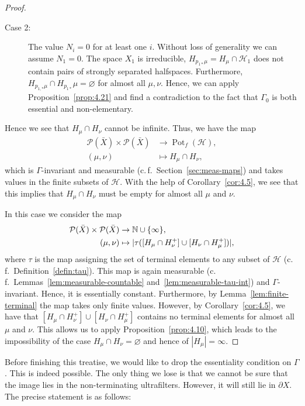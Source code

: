 \begin{proof}
\begin{description}
\begin{description}
    \item[Case 2:] The value \(N_i = 0\) for at least one \(i\). Without loss of generality we can assume \(N_1 = 0\). The space \(X_1\) is irreducible, \(H_{p_{1\ast}\mu} = H_\mu \cap \mathcal{H}_1\) does not contain pairs of strongly separated halfspaces. Furthermore, \(H_{p_{1,\ast}\mu} \cap H_{p_{1\ast}}\mu = \varnothing\) for almost all \(\mu, \nu\). Hence, we can apply Proposition~\ref{prop:4.21} and find a contradiction to the fact that \(\Gamma_0\) is both essential and non-elementary.
    \end{description}
  \end{description}
  Hence we see that \(H_\mu \cap H_\nu\) cannot be infinite. Thus, we have the map
  \begin{align*}
    \mathcal{P}(\bar X) \times \mathcal{P}(\bar X) & \to \operatorname{Pot}_f(\mathcal{H}),\\
    (\mu,\nu) &\mapsto H_\mu \cap H_\nu,
  \end{align*}
  which is \(\Gamma\)-invariant and measurable (c.\,f.~Section~\ref{sec:meas-maps}) and takes values in the finite subsets of \(\mathcal{H}\). With the help of Corollary~\ref{cor:4.5}, we see that this implies that \(H_\mu \cap H_\nu\) must be empty for almost all \(\mu\) and \(\nu\).

  In this case we consider the map
  \begin{align*}
    \mathcal{P}(\bar X) \times \mathcal{P}(\bar X) &\to \mathbb{N} \cup \{\infty\},\\
    (\mu, \nu) &\mapsto |\tau([H_\mu \cap H_\nu^+] \cup [H_\nu \cap H_\mu^+])|,
  \end{align*}
  where \(\tau\) is the map assigning the set of terminal elements to any subset of \(\mathcal{H}\) (c.\,f.~Definition~\ref{defin:tau}). This map is again measurable (c.\,f.\ Lemmas~\ref{lem:measurable-countable} and~\ref{lem:measurable-tau-int}) and \(\Gamma\)-invariant. Hence, it is essentially constant. Furthermore, by Lemma~\ref{lem:finite-terminal} the map takes only finite values. However, by Corollary~\ref{cor:4.5}, we have that \([H_\mu \cap H_\nu^+] \cup [H_\nu \cap H_\mu^+]\) contains no terminal elements for almost all \(\mu\) and \(\nu\). This allows us to apply Proposition~\ref{prop:4.10}, which leads to the impossibility of the case \(H_\mu \cap H_\nu = \varnothing\) and hence of \(|H_\mu| = \infty\). 
\end{proof}

Before finishing this treatise, we would like to drop the essentiality condition on \(\Gamma\). This is indeed possible. The only thing we lose is that we cannot be sure that the image lies in the non-terminating ultrafilters. However, it will still lie in \(\partial X\). The precise statement is as follows:


